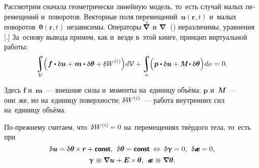 \begin{otherlanguage}{russian}
Рассмотрим сначала геометрически линейную модель, то~есть случай малых перемещений и~поворотов. Векторные поля перемещений~${\bm{u}(\bm{r},t)}$ и~малых поворотов~${\bm{\theta}(\bm{r},t)}$ независимы. Операторы ${\hspace{-0.2ex}\boldnablacircled\hspace{0.1ex}}$ и~${\hspace{-0.2ex}\boldnabla\hspace{0.1ex}}$~() неразличимы, уравнения [.] За~основу вывода примем, как и~везде в~этой книге, принцип виртуальной работы:
\vspace{0.1em}\begin{equation}
\integral\displaylimits_{\mathcal{V}} \hspace{-0.64ex} \left(^{\mathstrut} \bm{f} \dotp \variation{\bm{u}} + \bm{m} \dotp \variation{\bm{\theta}} + \variation{\internalwork} \hspace{.15ex} \right) \hspace{-0.32ex} d\mathcal{V} +
\integral\displaylimits_o \hspace{-0.64ex} \left(^{\mathstrut} \bm{p} \dotp \variation{\bm{u}} + \mathboldM \hspace{-0.1ex} \dotp \variation{\bm{\theta}} \right) \hspace{-0.32ex} do \hspace{0.12ex} = \hspace{0.1ex} 0 \hspace{0.1ex}.
\end{equation}

\vspace{-0.25em} \noindent Здесь $\bm{f}$ и~$\bm{m}$~--- внешние силы и~моменты на~единицу объёма; $\bm{p}$ и~$\mathboldM$~--- они~же, но на~единицу поверхности; ${\variation{\internalwork}}$~--- работа внутренних сил на~единицу объёма.

По\hbox{-}прежнему считаем, что~${\variation{\internalwork} = 0}$ на~перемещениях твёрдого тела, то~есть при
\begin{equation*}
\variation{\bm{u}} = \variation{\bm{\theta}} \hspace{-0.2ex} \times \hspace{-0.12ex} \bm{r} + \boldconst , \:\: \variation{\bm{\theta}} = \boldconst \:\Leftrightarrow\;
\variation{\bm{\upgamma}} = 0 , \:\: \variation{\mathboldae} = 0 ,
\end{equation*}\vspace{-1.11em}
\begin{equation}\label{deformationtensors:micropolarcontinuum}
\bm{\upgamma} \hspace{.16ex} \equiv \boldnabla \bm{u} \hspace{.1ex} + \bm{E} \hspace{-0.2ex} \times \hspace{-0.12ex} \bm{\theta} , \:\:
\mathboldae \hspace{.2ex} \equiv \boldnabla \bm{\theta} .
\end{equation}


\end{otherlanguage}
